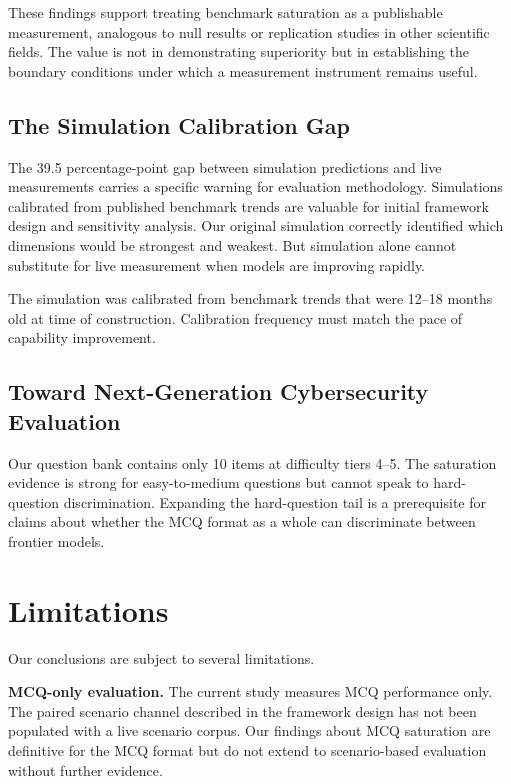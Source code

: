\documentclass[final]{elsarticle}
\begin{document}
These findings support treating benchmark saturation as a publishable measurement, analogous to null results or replication studies in other scientific fields. The value is not in demonstrating superiority but in establishing the boundary conditions under which a measurement instrument remains useful.

\subsection{The Simulation Calibration Gap}

The 39.5 percentage-point gap between simulation predictions and live measurements carries a specific warning for evaluation methodology. Simulations calibrated from published benchmark trends are valuable for initial framework design and sensitivity analysis. Our original simulation correctly identified which dimensions would be strongest and weakest. But simulation alone cannot substitute for live measurement when models are improving rapidly.

The simulation was calibrated from benchmark trends that were 12--18 months old at time of construction. Calibration frequency must match the pace of capability improvement.

\subsection{Toward Next-Generation Cybersecurity Evaluation}

Our question bank contains only 10 items at difficulty tiers 4--5. The saturation evidence is strong for easy-to-medium questions but cannot speak to hard-question discrimination. Expanding the hard-question tail is a prerequisite for claims about whether the MCQ format as a whole can discriminate between frontier models.

\section{Limitations}

Our conclusions are subject to several limitations.

\textbf{MCQ-only evaluation.} The current study measures MCQ performance only. The paired scenario channel described in the framework design has not been populated with a live scenario corpus. Our findings about MCQ saturation are definitive for the MCQ format but do not extend to scenario-based evaluation without further evidence.
\end{document}
